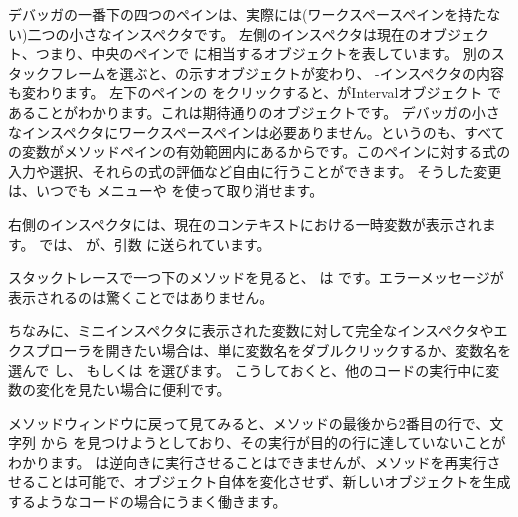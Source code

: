 \documentclass[a4paper,10pt,twoside]{book}
\begin{document}
デバッガの一番下の四つのペインは、実際には(ワークスペースペインを持たない)二つの小さなインスペクタです。
左側のインスペクタは現在のオブジェクト、つまり、中央のペインで \self に相当するオブジェクトを表しています。
別のスタックフレームを選ぶと、\self の示すオブジェクトが変わり、
\self{}-インスペクタの内容も変わります。
左下のペインの \self をクリックすると、\self がIntervalオブジェクト  であることがわかります。これは期待通りのオブジェクトです。
デバッガの小さなインスペクタにワークスペースペインは必要ありません。というのも、すべての変数がメソッドペインの有効範囲内にあるからです。このペインに対する式の入力や選択、それらの式の評価など自由に行うことができます。
そうした変更は、いつでも  メニューや  を使って取り消せます。

右側のインスペクタには、現在のコンテキストにおける一時変数が表示されます。
 では、
 が、引数  に送られています。


スタックトレースで一つ下のメソッドを見ると、 は  です。エラーメッセージが表示されるのは驚くことではありません。

ちなみに、ミニインスペクタに表示された変数に対して完全なインスペクタやエクスプローラを開きたい場合は、単に変数名をダブルクリックするか、変数名を選んで \actclick し、 もしくは  を選びます。
こうしておくと、他のコードの実行中に変数の変化を見たい場合に便利です。

メソッドウィンドウに戻って見てみると、メソッドの最後から2番目の行で、文字列  から  を見つけようとしており、その実行が目的の行に達していないことがわかります。
\pharo は逆向きに実行させることはできませんが、メソッドを再実行させることは可能で、オブジェクト自体を変化させず、新しいオブジェクトを生成するようなコードの場合にうまく働きます。

\end{document}
